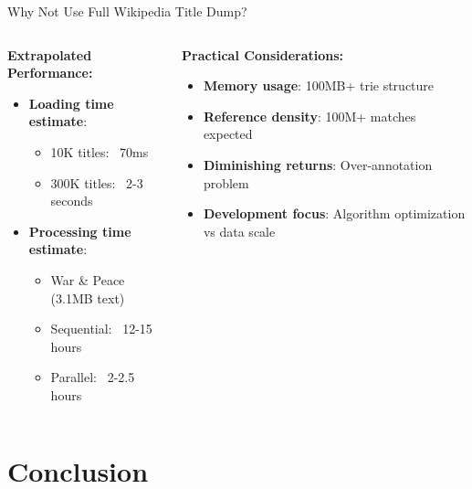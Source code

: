 \documentclass[aspectratio=169]{beamer}
\begin{document}
\begin{frame}{Why Not Use Full Wikipedia Title Dump?}
\begin{columns}
\begin{column}{0.5\textwidth}
\textbf{Extrapolated Performance:}
\begin{itemize}
    \item \textbf{Loading time estimate}: 
    \begin{itemize}
        \item 10K titles: ~70ms
        \item 300K titles: ~2-3 seconds
    \end{itemize}
    \item \textbf{Processing time estimate}:
    \begin{itemize}
        \item War \& Peace (3.1MB text)
        \item Sequential: ~12-15 hours
        \item Parallel: ~2-2.5 hours
    \end{itemize}
\end{itemize}
\end{column}
\begin{column}{0.5\textwidth}
\textbf{Practical Considerations:}
\begin{itemize}
    \item \textbf{Memory usage}: 100MB+ trie structure
    \item \textbf{Reference density}: 100M+ matches expected
    \item \textbf{Diminishing returns}: Over-annotation problem
    \item \textbf{Development focus}: Algorithm optimization vs data scale
\end{itemize}

\end{column}
\end{columns}
\end{frame}

\section{Conclusion}
\end{document}
